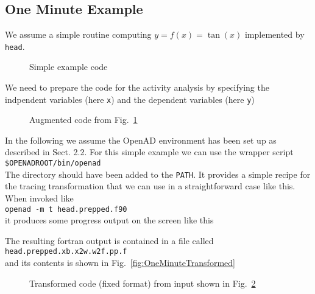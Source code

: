 \documentclass{article}
\newcommand{\reffig}[1]{{Fig.~\ref{#1}}}
\begin{document}
\subsection{One Minute Example}
We assume a simple routine computing $y=f(x)=\tan(x)$ implemented by \lstinline{head}.
\begin{figure}

\caption{Simple example code}\label{fig:oneMinute}
\end{figure}
We need to prepare the code for the activity analysis by specifying the indpendent variables
(here \lstinline{x}) and the dependent variables (here \lstinline{y})
\begin{figure}

\caption{Augmented code from \reffig{fig:oneMinute}}\label{fig:oneMinutePrepped}
\end{figure}
In the following we assume the OpenAD environment has been set up as 
described in \cite{userManual} Sect. 2.2.
For this simple example we can use the  wrapper script\\[1ex]
\hspace*{1cm}\lstinline{$OPENADROOT/bin/openad}\\[1ex] %
The directory should have been added to the \lstinline{PATH}. 
It provides a simple recipe for the tracing transformation that we can use in 
a straightforward case like this. When invoked like\\[1ex] 
\hspace*{1cm}\lstinline{openad -m t head.prepped.f90}\\[1ex]
it produces some progress output on the screen like this\\[1ex]
\hspace*{1cm}\begin{minipage}{\textwidth}
\small{}
\vspace*{1ex}
\end{minipage}
The resulting fortran output is contained in a file called\\[1ex]
\hspace*{1cm}\lstinline{head.prepped.xb.x2w.w2f.pp.f}\\[1ex] 
and its contents is shown in \reffig{fig:OneMinuteTransformed}  
\begin{figure}

\caption{Transformed code (fixed format) from input shown in \reffig{fig:oneMinutePrepped}}\label{fig:oneMinuteTransformed}
\end{figure}
\end{document}
